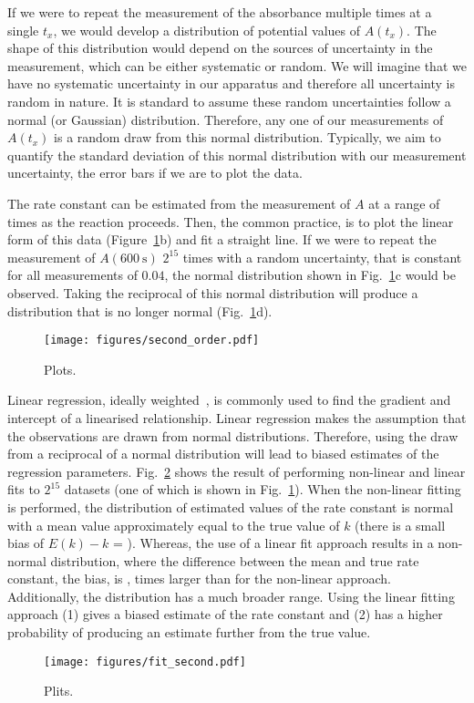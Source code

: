 \documentclass[reprint,superscriptaddress,nobibnotes,amsmath,amssymb]{revtex4-2}
\begin{document}
If we were to repeat the measurement of the absorbance multiple times at a single $t_x$, we would develop a distribution of potential values of $A(t_x)$.
The shape of this distribution would depend on the sources of uncertainty in the measurement, which can be either systematic or random. 
We will imagine that we have no systematic uncertainty in our apparatus and therefore all uncertainty is random in nature. 
It is standard to assume these random uncertainties follow a normal (or Gaussian) distribution. 
Therefore, any one of our measurements of $A(t_x)$ is a random draw from this normal distribution.
Typically, we aim to quantify the standard deviation of this normal distribution with our measurement uncertainty, the error bars if we are to plot the data. 

The rate constant can be estimated from the measurement of $A$ at a range of times as the reaction proceeds.
Then, the common practice, is to plot the linear form of this data (Figure~\ref{fig:second_order}b) and fit a straight line. 
If we were to repeat the measurement of $A(\SI{600}{\second})$ $2^{15}$ times with a random uncertainty, that is constant for all measurements of $0.04$, the normal distribution shown in Fig.~\ref{fig:second_order}c would be observed. 
Taking the reciprocal of this normal distribution will produce a distribution that is no longer normal (Fig.~\ref{fig:second_order}d). 
%
\begin{figure}
  \texttt{[image: figures/second\_order.pdf]}
  \caption{
    Plots.
    }
  \label{fig:second_order}
\end{figure}
%

Linear regression, ideally weighted~\cite{perrin_linear_2017}, is commonly used to find the gradient and intercept of a linearised relationship. 
Linear regression makes the assumption that the observations are drawn from normal distributions. 
Therefore, using the draw from a reciprocal of a normal distribution will lead to biased estimates of the regression parameters.
Fig.~\ref{fig:fit_second} shows the result of performing non-linear and linear fits to $2^15$ datasets (one of which is shown in Fig.~\ref{fig:second_order}). 
When the non-linear fitting is performed, the distribution of estimated values of the rate constant is normal with a mean value approximately equal to the true value of $k$ (there is a small bias of $E(k) - k$ = ).
Whereas, the use of a linear fit approach results in a non-normal distribution, where the difference between the mean and true rate constant, the bias, is ,  times larger than for the non-linear approach. 
Additionally, the distribution has a much broader range.
Using the linear fitting approach (1) gives a biased estimate of the rate constant and (2) has a higher probability of producing an estimate further from the true value. 
%
\begin{figure}
  \texttt{[image: figures/fit\_second.pdf]}
  \caption{
    Plits.
    }
  \label{fig:fit_second}
\end{figure}
%
\end{document}
